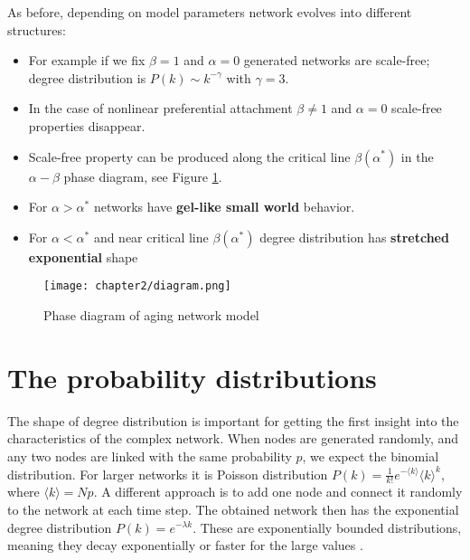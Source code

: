 As before, depending on model parameters network evolves into different structures:  
\begin{itemize}
	\item For example if we fix $\beta=1$ and $\alpha=0$ generated networks are scale-free; degree distribution is $P(k) \sim k^{-\gamma}$ with $\gamma=3$.
	\item In the case of nonlinear preferential attachment $\beta \neq 1$ and $\alpha=0$ scale-free properties disappear. 
	\item Scale-free property can be produced along the critical line $\beta(\alpha^{*})$ in the $\alpha-\beta$ phase diagram, see Figure \ref{fig:diagram}.
	
	\item For $\alpha>\alpha^{*}$ networks have \textbf{gel-like small world} behavior.
	
	\item For $\alpha<\alpha^{*}$ and near critical line $\beta(\alpha^{*})$ degree distribution has \textbf{stretched exponential} shape
	
\end{itemize}

\begin{figure}[h]
	\centering
	\texttt{[image: chapter2/diagram.png]}
	\caption[Phase diagram of aging network model]{Phase diagram of aging network model}
	\label{fig:diagram}
\end{figure}

\newpage

\section{The probability distributions}

The shape of degree distribution is important for getting the first insight into the characteristics of the complex network. When nodes are generated randomly, and any two nodes are linked with the same probability $p$,  we expect the binomial distribution. For larger networks it is Poisson distribution $P(k) = \frac{1}{k!}e^{-\langle k \rangle}\langle k \rangle^{k}$, where $\langle k \rangle = Np$. A different approach is to add one node and connect it randomly to the network at each time step. The obtained network then has the exponential degree distribution $P(k)=e^{-\lambda k}$. These are exponentially bounded distributions, meaning they decay exponentially or faster for the large values \cite{barabasi2016network}. 

